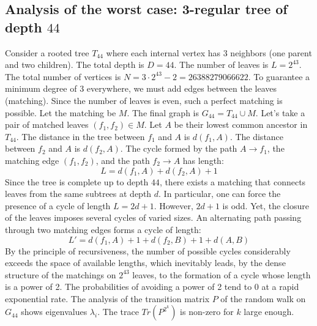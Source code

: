 \documentclass[12pt,a4paper]{article}
\begin{document}
\subsection{Analysis of the worst case: 3-regular tree of depth $44$}
Consider a rooted tree $T_{44}$ where each internal vertex has 3 neighbors (one parent and two children).
The total depth is $D = 44$.
The number of leaves is $L = 2^{43}$.
The total number of vertices is $N = 3 \cdot 2^{43} - 2 = 26388279066622$.
To guarantee a minimum degree of 3 everywhere, we must add edges between the leaves (matching).
Since the number of leaves is even, such a perfect matching is possible.
Let the matching be $M$. The final graph is $G_{44} = T_{44} \cup M$.
Let's take a pair of matched leaves $(f_1, f_2) \in M$.
Let $A$ be their lowest common ancestor in $T_{44}$.
The distance in the tree between $f_1$ and $A$ is $d(f_1, A)$.
The distance between $f_2$ and $A$ is $d(f_2, A)$.
The cycle formed by the path $A \to f_1$, the matching edge $(f_1, f_2)$, and the path $f_2 \to A$ has length:
$$ L = d(f_1, A) + d(f_2, A) + 1 $$
Since the tree is complete up to depth $44$, there exists a matching that connects leaves from the same subtrees at depth $d$.
In particular, one can force the presence of a cycle of length $L = 2d + 1$. However, $2d+1$ is odd.
Yet, the closure of the leaves imposes several cycles of varied sizes. An alternating path passing through two matching edges forms a cycle of length:
$$ L' = d(f_1, A) + 1 + d(f_2, B) + 1 + d(A, B) $$
By the principle of recursiveness, the number of possible cycles considerably exceeds the space of available lengths, which inevitably leads, by the dense structure of the matchings on $2^{43}$ leaves, to the formation of a cycle whose length is a power of 2. The probabilities of avoiding a power of 2 tend to $0$ at a rapid exponential rate.
The analysis of the transition matrix $P$ of the random walk on $G_{44}$ shows eigenvalues $\lambda_i$. The trace $Tr(P^{2^k})$ is non-zero for $k$ large enough.
\end{document}
